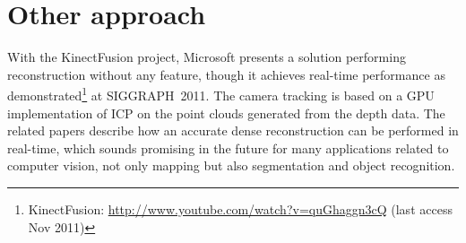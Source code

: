 \section{Other approach}

With the KinectFusion project, Microsoft presents a solution performing reconstruction without any feature, though it achieves real-time performance as demonstrated\footnote{KinectFusion: \url{http://www.youtube.com/watch?v=quGhaggn3cQ} (last access Nov 2011)} at SIGGRAPH~2011. The camera tracking is based on a GPU implementation of \gls{ICP} on the point clouds generated from the depth data. The related papers \cite{Izadi_2011_SIGGRAPH} \cite{Newcombe_2011_ISMAR} describe how an accurate dense reconstruction can be performed in real-time, which sounds promising in the future for many applications related to computer vision, not only mapping but also segmentation and object recognition.
